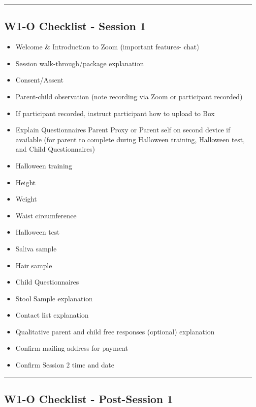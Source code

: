 \documentclass[]{book}
\providecommand{\tightlist}{%
  \setlength{\itemsep}{0pt}\setlength{\parskip}{0pt}}
\begin{document}
\begin{center}\rule{0.5\linewidth}{0.5pt}\end{center}

\hypertarget{w1-o-checklist---session-1}{%
\subsection{W1-O Checklist - Session 1}\label{w1-o-checklist---session-1}}

\begin{itemize}
\tightlist
\item
  Welcome \& Introduction to Zoom (important features- chat)
\item
  Session walk-through/package explanation
\item
  Consent/Assent
\item
  Parent-child observation (note recording via Zoom or participant recorded)
\item
  If participant recorded, instruct participant how to upload to Box
\item
  Explain Questionnaires Parent Proxy or Parent self on second device if available (for parent to complete during Halloween training, Halloween test, and Child Questionnaires)
\item
  Halloween training
\item
  Height
\item
  Weight
\item
  Waist circumference
\item
  Halloween test
\item
  Saliva sample
\item
  Hair sample
\item
  Child Questionnaires
\item
  Stool Sample explanation
\item
  Contact list explanation
\item
  Qualitative parent and child free responses (optional) explanation
\item
  Confirm mailing address for payment
\item
  Confirm Session 2 time and date
\end{itemize}

\begin{center}\rule{0.5\linewidth}{0.5pt}\end{center}

\hypertarget{w1-o-checklist---post-session-1}{%
\subsection{W1-O Checklist - Post-Session 1}\label{w1-o-checklist---post-session-1}}
\end{document}
